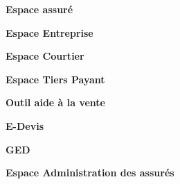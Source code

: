 \begin{itemize}[font=\normalsize]
                 \textbf{Espace assuré}
                 \end{itemize}
                 \begin{itemize}[font=\normalsize]
                  \textbf{Espace Entreprise}
                  \end{itemize}
                  \begin{itemize}[font=\normalsize]
                   \textbf{Espace Courtier}
                   \end{itemize}
                   \begin{itemize}[font=\normalsize]
                    \textbf{Espace Tiers Payant}
                 \end{itemize}
                 \begin{itemize}[font=\normalsize]
                  \textbf{Outil aide à la vente}
                  \end{itemize}
                  \begin{itemize}[font=\normalsize]
                   \textbf{E-Devis}
                   \end{itemize}
                   \begin{itemize}[font=\normalsize]
                  \textbf{GED}
                  \end{itemize}
                  \begin{itemize}[font=\normalsize]
                   \textbf{Espace Administration des assurés}
                   \end{itemize}
                   
